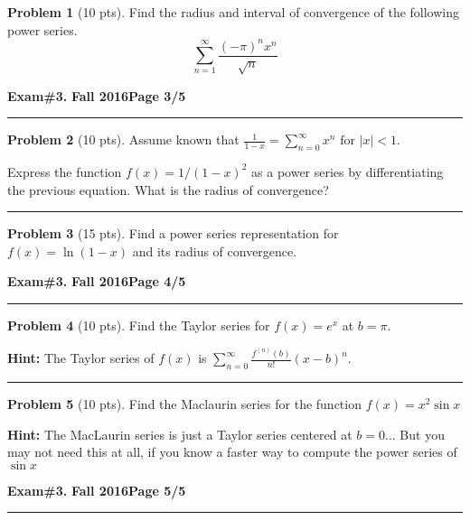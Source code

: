 \documentclass[12pt]{article}
\theoremstyle{definition}
\newtheorem{problem}{Problem}
\begin{document}
\begin{problem}[10 pts]
Find the radius and interval of convergence of the following power series.
\begin{equation*}
\sum_{n=1}^\infty \frac{(-\pi)^n x^n}{\sqrt{n}}
\end{equation*}
\end{problem}


\newpage


\hfill{\large\bf Exam\#3.}\hfill{\large\bf
Fall 2016}\hfill{\large\bf Page 3/5}\hrule

\bigskip
\begin{problem}[10 pts]
Assume known that $\displaystyle{ \frac{1}{1-x} = \sum_{n=0}^\infty x^n \text{ for } \lvert x \rvert <1}$.

\noindent Express the function $f(x)=1/(1-x)^2$ as a power series by differentiating the previous equation.  What is the radius of convergence?
\vspace{8cm}
\end{problem}
\hrule

\begin{problem}[15 pts]
Find a power series representation for $f(x) = \ln(1-x)$ and its radius of convergence.
\end{problem}
\newpage

\hfill{\large\bf Exam\#3.}\hfill{\large\bf
Fall 2016}\hfill{\large\bf Page 4/5}\hrule

\bigskip

\begin{problem}[10 pts]
Find the Taylor series for $f(x) = e^x$ at $b=\pi$.

\textbf{Hint: } The Taylor series of $f(x)$ is $\displaystyle{ \sum_{n=0}^\infty \frac{f^{(n)}(b)}{n!} (x-b)^n }.$
\vspace{10cm}
\end{problem}
\hrule

\begin{problem}[10 pts]
Find the Maclaurin series for the function $f(x) = x^2 \sin x$

\textbf{Hint: } The MacLaurin series is just a Taylor series centered at $b=0$... But you may not need this at all, if you know a faster way to compute the power series of $\sin x$
\end{problem}
\newpage

\hfill{\large\bf Exam\#3.}\hfill{\large\bf
Fall 2016}\hfill{\large\bf Page 5/5}\hrule
\end{document}
